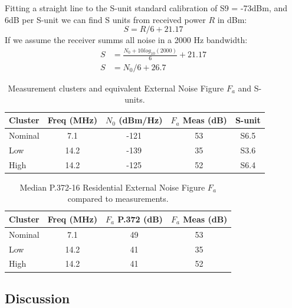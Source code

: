 \documentclass{article}
\begin{document}
Fitting a straight line to the S-unit standard calibration of S9 = -73dBm, and 6dB per S-unit we can find S units from received power $R$ in dBm:
\begin{equation}
S = R/6 + 21.17
\end{equation}
If we assume the receiver summs all noise in a 2000 Hz bandwidth:
\begin{equation} \label{eq:s_unit}
\begin{split}
S &= \frac{N_0+10log_{10}(2000)}{6} + 21.17 \\
S &= N_0/6 + 26.7
\end{split}
\end{equation}

\begin{table}[h]
\centering
\begin{tabular}{l c c c c}
 \hline
 Cluster & Freq (MHz) & $N_0$ (dBm/Hz) & $F_a$ Meas (dB) & S-unit \\
 \hline
 Nominal & 7.1  & -121 & 53 & S6.5 \\
 Low     & 14.2 & -139 & 35 & S3.6 \\
 High    & 14.2 & -125 & 52 & S6.4 \\
\end{tabular}
\caption{Measurement clusters and equivalent External Noise Figure $F_a$ and S-units.}
\label{table:measurement_clusters}
\end{table}

\begin{table}[h]
\centering
\begin{tabular}{l c c c}
 \hline
 Cluster & Freq (MHz) & $F_a$ P.372 (dB) & $F_a$ Meas (dB) \\
 \hline
 Nominal & 7.1  & 49 & 53 \\
 Low     & 14.2 & 41 & 35 \\
 High    & 14.2 & 41 & 52 \\
\end{tabular}
\caption{Median P.372-16 Residential External Noise Figure $F_a$ compared to measurements.}
\label{table:external_noise_figure}
\end{table}

\subsection{Discussion}
\end{document}
